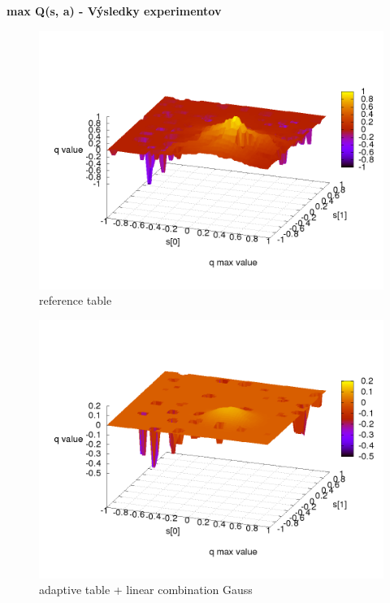 \documentclass[xcolor=dvipsnames]{beamer}
\begin{document}
\begin{frame}{\bf max Q(s, a) - Výsledky experimentov}

\begin{minipage}{.5\textwidth}

\begin{figure}[!htb]
\centering
\includegraphics[scale=.2]{../../results_q_learning/map_2/function_type_0/iterations_10/q_learning_result.png}
\caption{reference table}
\end{figure}

\end{minipage}%
\begin{minipage}{.5\textwidth}

\begin{figure}[!htb]
\centering
\includegraphics[scale=.2]{../../results_q_learning/map_2/function_type_6/iterations_10/q_learning_result.png}
\caption{adaptive table + linear combination Gauss}
\end{figure}


\end{minipage}
\end{frame}
\end{document}
